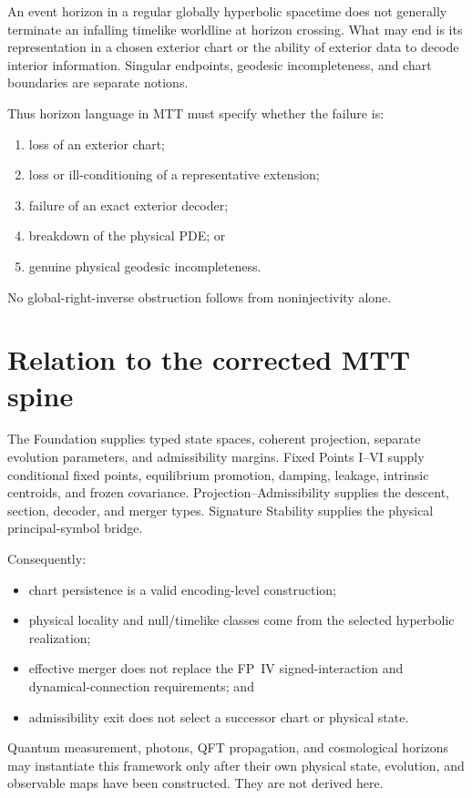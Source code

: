 \documentclass[11pt]{article}
\begin{document}
An event horizon in a regular globally hyperbolic spacetime does not generally
terminate an infalling timelike worldline at horizon crossing. What may end is
its representation in a chosen exterior chart or the ability of exterior data
to decode interior information. Singular endpoints, geodesic incompleteness,
and chart boundaries are separate notions.

Thus horizon language in MTT must specify whether the failure is:
\begin{enumerate}
\item loss of an exterior chart;
\item loss or ill-conditioning of a representative extension;
\item failure of an exact exterior decoder;
\item breakdown of the physical PDE; or
\item genuine physical geodesic incompleteness.
\end{enumerate}
No global-right-inverse obstruction follows from noninjectivity alone.

\section{Relation to the corrected MTT spine}

The Foundation supplies typed state spaces, coherent projection, separate
evolution parameters, and admissibility margins. Fixed Points I--VI supply
conditional fixed points, equilibrium promotion, damping, leakage, intrinsic
centroids, and frozen covariance. Projection--Admissibility supplies the
descent, section, decoder, and merger types. Signature Stability supplies the
physical principal-symbol bridge.

Consequently:
\begin{itemize}
\item chart persistence is a valid encoding-level construction;
\item physical locality and null/timelike classes come from the selected
hyperbolic realization;
\item effective merger does not replace the FP~IV signed-interaction and
dynamical-connection requirements; and
\item admissibility exit does not select a successor chart or physical state.
\end{itemize}

Quantum measurement, photons, QFT propagation, and cosmological horizons may
instantiate this framework only after their own physical state, evolution, and
observable maps have been constructed. They are not derived here.
\end{document}
